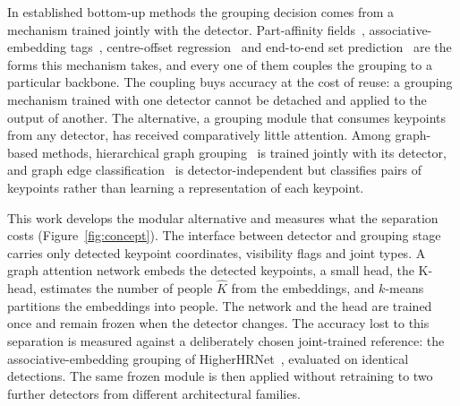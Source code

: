 In established bottom-up methods the grouping decision comes from a mechanism
trained jointly with the detector.
Part-affinity fields~\citep{cao2017openpose},
associative-embedding tags~\citep{newell2017associative,cheng2020higherhrnet},
centre-offset regression~\citep{geng2021dekr}
and end-to-end set prediction~\citep{shi2022petr} are the forms this mechanism takes,
and every one of them couples the grouping to a particular backbone.
The coupling buys accuracy at the cost of reuse: a grouping mechanism trained with one
detector cannot be detached and applied to the output of another.
The alternative, a grouping module that consumes keypoints from any detector,
has received comparatively little attention.
Among graph-based methods, hierarchical graph grouping~\citep{jin2020hgg} is trained jointly
with its detector,
and graph edge classification~\citep{maher2025gec} is detector-independent but classifies
pairs of keypoints rather than learning a representation of each keypoint.

This work develops the modular alternative and measures what the separation costs
(Figure~\ref{fig:concept}).
The interface between detector and grouping stage carries only detected keypoint
coordinates, visibility flags and joint types.
A graph attention network embeds the detected keypoints,
a small head, the K-head, estimates the number of people $\hat K$ from the embeddings,
and $k$-means partitions the embeddings into people.
The network and the head are trained once and remain frozen when the detector changes.
The accuracy lost to this separation is measured against a deliberately chosen
joint-trained reference:
the associative-embedding grouping of HigherHRNet~\citep{cheng2020higherhrnet},
evaluated on identical detections.
The same frozen module is then applied without retraining
to two further detectors from different architectural families.

